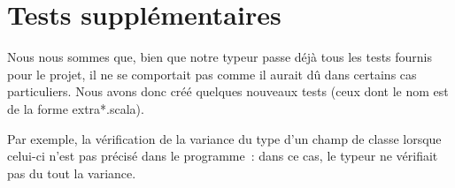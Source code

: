 \documentclass[a4paper,10pt]{article}
\newcommand{\code}[1]{#1} %
\begin{document}
\section{Tests supplémentaires}

Nous nous sommes que, bien que notre typeur passe déjà tous les tests fournis pour 
le projet, il ne se comportait pas comme il aurait dû dans certains cas 
particuliers. Nous avons donc créé quelques nouveaux tests (ceux dont le nom est de 
la forme \code{extra*.scala}).

Par exemple, la vérification de la variance du type d'un champ de classe lorsque 
celui-ci n'est pas précisé dans le programme~: dans ce cas, le typeur ne vérifiait 
pas du tout la variance.
\end{document}

